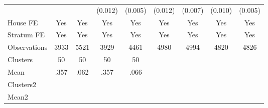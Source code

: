 {\begin{tabular}{l*{8}{c}}
                &                  &                  &  (0.012)         &  (0.005)         &  (0.012)         &  (0.007)         &  (0.010)         &  (0.005)         \\
House FE        &      Yes         &      Yes         &      Yes         &      Yes         &      Yes         &      Yes         &      Yes         &      Yes         \\
Stratum FE      &      Yes         &      Yes         &      Yes         &      Yes         &      Yes         &      Yes         &      Yes         &      Yes         \\
\midrule
Observations    &     3933         &     5521         &     3929         &     4461         &     4980         &     4994         &     4820         &     4826         \\
Clusters        &       50         &       50         &       50         &       50         &                  &                  &                  &                  \\
Mean            &     .357         &     .062         &     .357         &     .066         &                  &                  &                  &                  \\
Clusters2       &                  &                  &                  &                  &                  &                  &                  &                  \\
Mean2           &                  &                  &                  &                  &                  &                  &                  &                  \\
\bottomrule
\end{tabular}
}
